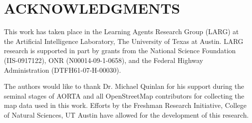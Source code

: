 \documentclass[letterpaper, 10 pt, conference]{ieeeconf}  %
\begin{document}
\small
\section*{ACKNOWLEDGMENTS}

This work has taken place in the Learning Agents Research Group (LARG) at the
Artificial Intelligence Laboratory, The University of Texas at Austin. LARG
research is supported in part by grants from the National Science Foundation
(IIS-0917122), ONR (N00014-09-1-0658), and the Federal Highway Administration
(DTFH61-07-H-00030). 

The authors would like to thank Dr. Michael Quinlan for his support during the
seminal stages of AORTA and all OpenStreetMap contributors for collecting the
map data used in this work. Efforts by the Freshman Research Initiative,
College of Natural Sciences, UT Austin have allowed for the development of this
research.




\end{document}
